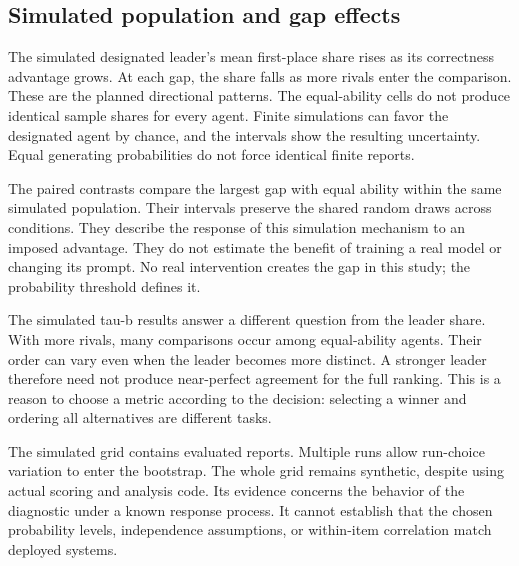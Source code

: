 \documentclass{article}
\begin{document}
\subsection{Simulated population and gap effects}


The simulated designated leader's mean first-place share rises as its correctness advantage grows. At each gap, the share falls as more rivals enter the comparison. These are the planned directional patterns. The equal-ability cells do not produce identical sample shares for every agent. Finite simulations can favor the designated agent by chance, and the intervals show the resulting uncertainty. Equal generating probabilities do not force identical finite reports.\par

The paired contrasts compare the largest gap with equal ability within the same simulated population. Their intervals preserve the shared random draws across conditions. They describe the response of this simulation mechanism to an imposed advantage. They do not estimate the benefit of training a real model or changing its prompt. No real intervention creates the gap in this study; the probability threshold defines it.\par
The simulated tau-b results answer a different question from the leader share. With more rivals, many comparisons occur among equal-ability agents. Their order can vary even when the leader becomes more distinct. A stronger leader therefore need not produce near-perfect agreement for the full ranking. This is a reason to choose a metric according to the decision: selecting a winner and ordering all alternatives are different tasks.\par
The simulated grid contains \SimReports{} evaluated reports. Multiple runs allow run-choice variation to enter the bootstrap. The whole grid remains synthetic, despite using actual scoring and analysis code. Its evidence concerns the behavior of the diagnostic under a known response process. It cannot establish that the chosen probability levels, independence assumptions, or within-item correlation match deployed systems.\par
\end{document}
